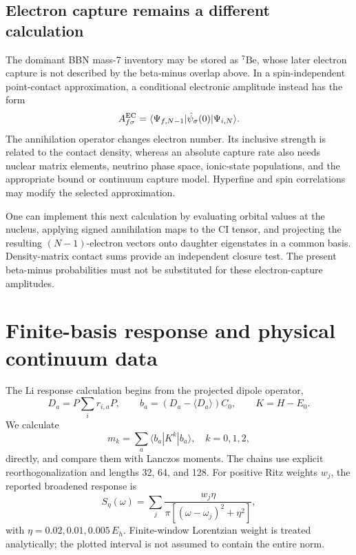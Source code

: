 \documentclass[
  10pt,
]{article}
\begin{document}
\hypertarget{electron-capture-remains-a-different-calculation}{%
\subsection{Electron capture remains a different
calculation}\label{electron-capture-remains-a-different-calculation}}

The dominant BBN mass-7 inventory may be stored as \(^{7}\mathrm{Be}\),
whose later electron capture is not described by the beta-minus overlap
above. In a spin-independent point-contact approximation, a conditional
electronic amplitude instead has the form \[
A_{f\sigma}^{\rm EC}
=\langle \Psi_{f,N-1}|\hat\psi_\sigma(0)|\Psi_{i,N}\rangle.
\] The annihilation operator changes electron number. Its inclusive
strength is related to the contact density, whereas an absolute capture
rate also needs nuclear matrix elements, neutrino phase space,
ionic-state populations, and the appropriate bound or continuum capture
model. Hyperfine and spin correlations may modify the selected
approximation.

One can implement this next calculation by evaluating orbital values at
the nucleus, applying signed annihilation maps to the CI tensor, and
projecting the resulting \((N-1)\)-electron vectors onto daughter
eigenstates in a common basis. Density-matrix contact sums provide an
independent closure test. The present beta-minus probabilities must not
be substituted for these electron-capture amplitudes.

\hypertarget{finite-basis-response-and-physical-continuum-data}{%
\section{Finite-basis response and physical continuum
data}\label{finite-basis-response-and-physical-continuum-data}}

The Li response calculation begins from the projected dipole operator,
\[
D_a=P\sum_i r_{i,a}P,\qquad
b_a=(D_a-\langle D_a\rangle)C_0,\qquad K=H-E_0.
\] We calculate \[
m_k=\sum_a\langle b_a|K^k|b_a\rangle,\quad k=0,1,2,
\] directly, and compare them with Lanczos moments. The chains use
explicit reorthogonalization and lengths 32, 64, and 128. For positive
Ritz weights \(w_j\), the reported broadened response is \[
S_\eta(\omega)=\sum_j
\frac{w_j\eta}{\pi[(\omega-\omega_j)^2+\eta^2]},
\] with \(\eta=0.02,0.01,0.005\,E_h\). Finite-window Lorentzian weight
is treated analytically; the plotted interval is not assumed to contain
the entire norm.
\end{document}
